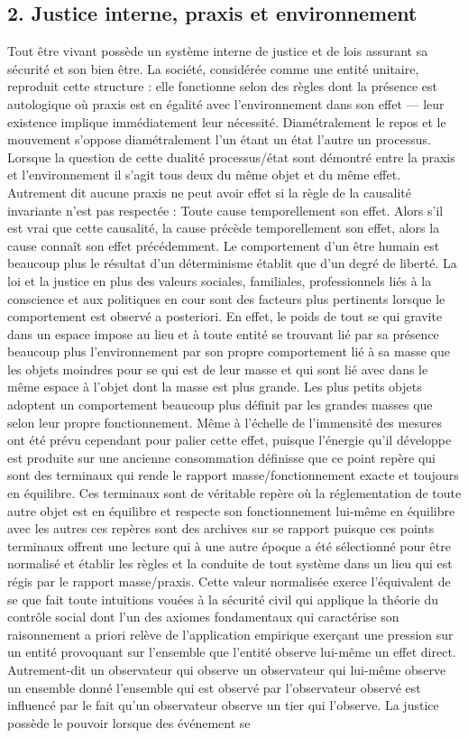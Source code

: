 \documentclass[12pt,letterpaper,oneside]{article}
\begin{document}
\subsection*{2. Justice interne, praxis et environnement}
Tout être vivant possède un système interne de justice et de lois assurant sa sécurité et son bien être. La société, considérée comme une entité unitaire, reproduit cette structure : elle fonctionne selon des règles dont la présence est autologique où praxis est en égalité avec l’environnement dans son effet — leur existence implique immédiatement leur nécessité. Diamétralement le repos et le mouvement s’oppose diamétralement l’un étant un état l’autre un processus. Lorsque la question de cette dualité processus/état sont démontré entre la praxis et l’environnement il s’agit tous deux du même objet et du même effet. Autrement dit aucune praxis ne peut avoir effet si la règle de la causalité invariante n’est pas respectée : Toute cause temporellement son effet. Alors s’il est vrai que cette causalité, la cause précède temporellement son effet, alors la cause connaît son effet précédemment. Le comportement d’un être humain est beaucoup plus le résultat d’un déterminisme établit que d’un degré de liberté. La loi et la justice en plus des valeurs sociales, familiales, professionnels liés à la conscience et aux politiques en cour sont des facteurs plus pertinents lorsque le comportement est observé a posteriori. En effet, le poids de tout se qui gravite dans un espace impose au lieu et à toute entité se trouvant lié par sa présence beaucoup plus l’environnement par son propre comportement lié à sa masse que les objets moindres pour se qui est de leur masse et qui sont lié avec dans le même espace à l’objet dont la masse est plus grande. Les plus petits objets adoptent un comportement beaucoup plus définit par les grandes masses que selon leur propre fonctionnement. Même à l’échelle de l’immensité des mesures ont été prévu cependant pour palier cette effet, puisque l’énergie qu’il développe est produite sur une ancienne consommation définisse que ce point repère qui sont des terminaux qui rende le rapport masse/fonctionnement exacte et toujours en équilibre. Ces terminaux sont de véritable repère où la réglementation de toute autre objet est en équilibre et respecte son fonctionnement lui-même en équilibre avec les autres ces repères sont des archives sur se rapport puisque ces points terminaux offrent une lecture qui à une autre époque a été sélectionné pour être normalisé et établir les règles et la conduite de tout système dans un lieu qui est régis par le rapport masse/praxis. Cette valeur normalisée exerce l’équivalent de se que fait toute intuitions vouées à la sécurité civil qui applique la théorie du contrôle social dont l’un des axiomes fondamentaux qui caractérise son raisonnement a priori relève de l’application empirique exerçant une pression sur un entité provoquant sur l’ensemble que l’entité observe lui-même un effet direct. Autrement-dit un observateur qui observe un observateur qui lui-même observe un ensemble donné l’ensemble qui est observé par l’observateur observé est influencé par le fait qu’un observateur observe un tier qui l’observe. La justice possède le pouvoir lorsque des événement se 
\end{document}
